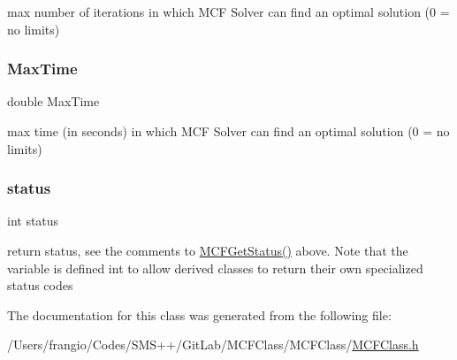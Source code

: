 max number of iterations in which M\+CF Solver can find an optimal solution (0 = no limits) \mbox{\label{class_m_c_f_class_a8bad127f3e412819d99baff0c51e5be8}} 
\subsubsection{\texorpdfstring{Max\+Time}{MaxTime}}
{\footnotesize\ttfamily double Max\+Time\hspace{0.3cm}{\ttfamily [protected]}}

max time (in seconds) in which M\+CF Solver can find an optimal solution (0 = no limits) \mbox{\label{class_m_c_f_class_a6e27f49150e9a14580fb313cc2777e00}} 
\subsubsection{\texorpdfstring{status}{status}}
{\footnotesize\ttfamily int status\hspace{0.3cm}{\ttfamily [protected]}}

return status, see the comments to \mbox{\hyperlink{class_m_c_f_class_a333e27ad7a73779b096cb70829cbe8be}{M\+C\+F\+Get\+Status()}} above. Note that the variable is defined int to allow derived classes to return their own specialized status codes 

The documentation for this class was generated from the following file\+:\begin{DoxyCompactItemize}
\item 
/\+Users/frangio/\+Codes/\+S\+M\+S++/\+Git\+Lab/\+M\+C\+F\+Class/\+M\+C\+F\+Class/\mbox{\hyperlink{_m_c_f_class_8h}{M\+C\+F\+Class.\+h}}\end{DoxyCompactItemize}
